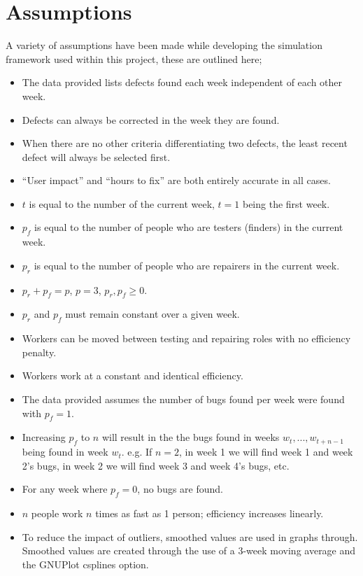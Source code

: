 \documentclass[a4paper,10pt]{article}
\begin{document}
\section{Assumptions}
A variety of assumptions have been made while developing the simulation framework used within this project, these are outlined here;
\begin{itemize}
 \item The data provided lists defects found each week independent of each other week.
 \item Defects can always be corrected in the week they are found.
 \item When there are no other criteria differentiating two defects, the least recent defect will always be selected first.
 \item ``User impact'' and ``hours to fix'' are both entirely accurate in all cases.
 \item $t$ is equal to the number of the current week, $t = 1$ being the first week.
 \item $p_f$ is equal to the number of people who are testers (finders) in the current week.
 \item $p_r$ is equal to the number of people who are repairers in the current week.
 \item $p_r + p_f = p$, $p = 3$, $p_r, p_f \geq 0$.
 \item $p_r$ and $p_f$ must remain constant over a given week.
 \item Workers can be moved between testing and repairing roles with no efficiency penalty.
 \item Workers work at a constant and identical efficiency.
 \item The data provided assumes the number of bugs found per week were found with $p_f = 1$.
 \item Increasing $p_f$ to $n$ will result in the the bugs found in weeks $w_t, ..., w_{t+n-1}$ being found in week $w_t$. e.g. If $n = 2$, in week 1 we will find week 1 and week 2's bugs, in week 2 we will find week 3 and week 4's bugs, etc.
 \item For any week where $p_f = 0$, no bugs are found.
 \item $n$ people work $n$ times as fast as 1 person; efficiency increases linearly.
 \item To reduce the impact of outliers, smoothed values are used in graphs through. Smoothed values are created through the use of a 3-week moving average and the GNUPlot csplines option.
\end{itemize}
\end{document}

